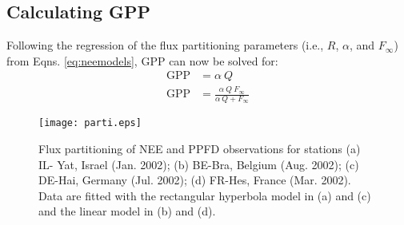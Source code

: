 \subsection{Calculating GPP}
\label{sec:calcgpp}
Following the regression of the flux partitioning parameters (i.e., $R$, $\alpha$, and $F_\infty$) from Eqns. \ref{eq:neemodels}, GPP can now be solved for:
\begin{subequations}
\label{eq:gppmod}
\begin{align}
    \text{GPP} &= \alpha\: Q \label{eq:gppl}\\
    \text{GPP} &= \frac{\alpha\: Q\: F_{\infty}}
                       {\alpha\: Q + F_{\infty}} \label{eq:gpph}
\end{align}
\end{subequations}
\begin{figure}[h!]
    \texttt{[image: parti.eps]}
    \caption{Flux partitioning of NEE and PPFD observations for stations (a) IL-
    Yat, Israel (Jan. 2002); (b) BE-Bra, Belgium (Aug. 2002); (c) DE-Hai, 
    Germany (Jul. 2002); (d) FR-Hes, France (Mar. 2002).  Data are fitted with 
    the rectangular hyperbola model in (a) and (c) and the linear model in (b) 
    and (d). }
    \label{fig:parti}
\end{figure}

